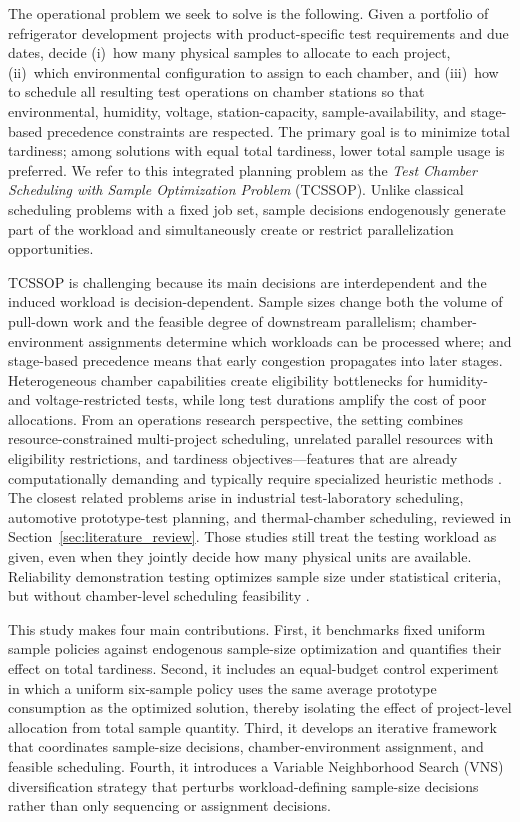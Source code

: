 The operational problem we seek to solve is the following. Given a portfolio of refrigerator development projects with product-specific test requirements and due dates, decide (i)~how many physical samples to allocate to each project, (ii)~which environmental configuration to assign to each chamber, and (iii)~how to schedule all resulting test operations on chamber stations so that environmental, humidity, voltage, station-capacity, sample-availability, and stage-based precedence constraints are respected. The primary goal is to minimize total tardiness; among solutions with equal total tardiness, lower total sample usage is preferred. We refer to this integrated planning problem as the \emph{Test Chamber Scheduling with Sample Optimization Problem} (TCSSOP). Unlike classical scheduling problems with a fixed job set, sample decisions endogenously generate part of the workload and simultaneously create or restrict parallelization opportunities.

TCSSOP is challenging because its main decisions are interdependent and the induced workload is decision-dependent. Sample sizes change both the volume of pull-down work and the feasible degree of downstream parallelism; chamber-environment assignments determine which workloads can be processed where; and stage-based precedence means that early congestion propagates into later stages. Heterogeneous chamber capabilities create eligibility bottlenecks for humidity- and voltage-restricted tests, while long test durations amplify the cost of poor allocations. From an operations research perspective, the setting combines resource-constrained multi-project scheduling, unrelated parallel resources with eligibility restrictions, and tardiness objectives---features that are already computationally demanding and typically require specialized heuristic methods \citep{HartmannBriskorn2022,GomezSanchezLallaRuizFernandezGilCastroVoss2023,UlagaDurasevicJakobovic2022,MaeckerShenMonch2023,AfzaliradRezaeian2016}. The closest related problems arise in industrial test-laboratory scheduling, automotive prototype-test planning, and thermal-chamber scheduling, reviewed in Section~\ref{sec:literature_review}. Those studies still treat the testing workload as given, even when they jointly decide how many physical units are available. Reliability demonstration testing optimizes sample size under statistical criteria, but without chamber-level scheduling feasibility \citep{Fernandez2022}.

This study makes four main contributions. First, it benchmarks fixed uniform sample policies against endogenous sample-size optimization and quantifies their effect on total tardiness. Second, it includes an equal-budget control experiment in which a uniform six-sample policy uses the same average prototype consumption as the optimized solution, thereby isolating the effect of project-level allocation from total sample quantity. Third, it develops an iterative framework that coordinates sample-size decisions, chamber-environment assignment, and feasible scheduling. Fourth, it introduces a Variable Neighborhood Search (VNS) diversification strategy that perturbs workload-defining sample-size decisions rather than only sequencing or assignment decisions.

